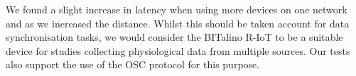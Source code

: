 We found a slight increase in latency when using more devices on one network and as we increased the distance. Whilst this should be taken account for data synchronisation tasks, we would consider the BITalino R-IoT to be a suitable device for studies collecting physiological data from multiple sources. Our tests also support the use of the OSC protocol for this purpose.
